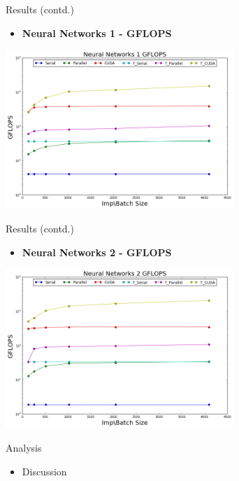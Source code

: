 \begin{frame}{Results (contd.)}
     \begin{itemize}
         \item{ \textbf{Neural Networks 1 - GFLOPS}
         }
     \end{itemize}
     
		\begin{center}
		\includegraphics[width=3.4in]{nn1_gflops.png}
		\end{center}

 \end{frame} 

\begin{frame}{Results (contd.)}
     \begin{itemize}
         \item{ \textbf{Neural Networks 2 - GFLOPS}
         }
     \end{itemize}
     
		\begin{center}
		\includegraphics[width=3.4in]{nn2_gflops.png}
		\end{center}

 \end{frame} 

 
 \begin{frame}{Analysis}
 	\begin{itemize}
 	\item {Discussion}
 	\end{itemize}
 
 \end{frame}





